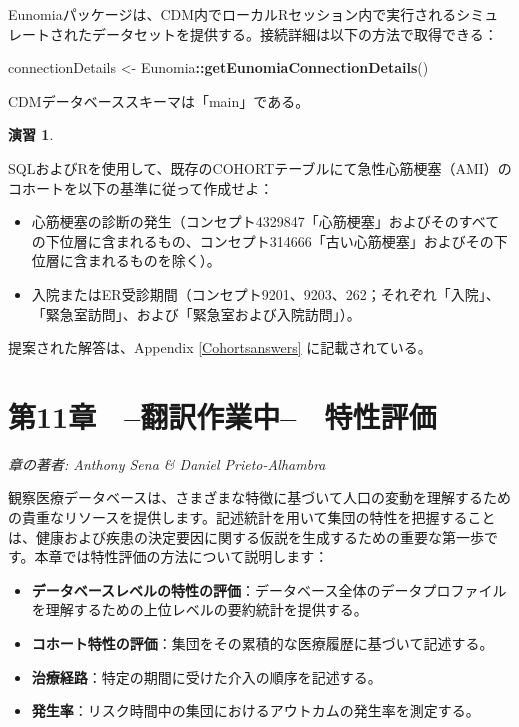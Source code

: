 \documentclass[
  11pt]{book}
\newenvironment{Shaded}{\begin{snugshade}}{\end{snugshade}}
\newcommand{\FunctionTok}[1]{\textcolor[rgb]{0.13,0.29,0.53}{\textbf{#1}}}
\newcommand{\NormalTok}[1]{#1}
\newcommand{\OtherTok}[1]{\textcolor[rgb]{0.56,0.35,0.01}{#1}}
\newcommand{\SpecialCharTok}[1]{\textcolor[rgb]{0.81,0.36,0.00}{\textbf{#1}}}
\providecommand{\tightlist}{%
  \setlength{\itemsep}{0pt}\setlength{\parskip}{0pt}}
\theoremstyle{definition}
\theoremstyle{definition}
\theoremstyle{definition}
\newtheorem{exercise}{演習}[chapter]
\theoremstyle{definition}
\theoremstyle{remark}
\begin{document}
Eunomiaパッケージは、CDM内でローカルRセッション内で実行されるシミュレートされたデータセットを提供する。接続詳細は以下の方法で取得できる：

\begin{Shaded}
\begin{Highlighting}[]
\NormalTok{connectionDetails }\OtherTok{\textless{}{-}}\NormalTok{ Eunomia}\SpecialCharTok{::}\FunctionTok{getEunomiaConnectionDetails}\NormalTok{()}
\end{Highlighting}
\end{Shaded}

CDMデータベーススキーマは「main」である。

\begin{exercise}
\protect\hypertarget{exr:exerciseCohortsSql}{}\label{exr:exerciseCohortsSql}

SQLおよびRを使用して、既存のCOHORTテーブルにて急性心筋梗塞（AMI）のコホートを以下の基準に従って作成せよ：

\begin{itemize}
\tightlist
\item
  心筋梗塞の診断の発生（コンセプト4329847「心筋梗塞」およびそのすべての下位層に含まれるもの、コンセプト314666「古い心筋梗塞」およびその下位層に含まれるものを除く）。
\item
  入院またはER受診期間（コンセプト9201、9203、262；それぞれ「入院」、 「緊急室訪問」、および「緊急室および入院訪問」）。
\end{itemize}

\end{exercise}

提案された解答は、Appendix \ref{Cohortsanswers} に記載されている。

\chapter{第11章　--翻訳作業中--　特性評価}\label{Characterization}

\emph{章の著者: Anthony Sena \& Daniel Prieto-Alhambra}

観察医療データベースは、さまざまな特徴に基づいて人口の変動を理解するための貴重なリソースを提供します。記述統計を用いて集団の特性を把握することは、健康および疾患の決定要因に関する仮説を生成するための重要な第一歩です。本章では特性評価の方法について説明します：

\begin{itemize}
\tightlist
\item
  \textbf{データベースレベルの特性の評価}：データベース全体のデータプロファイルを理解するための上位レベルの要約統計を提供する。
\item
  \textbf{コホート特性の評価}：集団をその累積的な医療履歴に基づいて記述する。
\item
  \textbf{治療経路}：特定の期間に受けた介入の順序を記述する。
\item
  \textbf{発生率}：リスク時間中の集団におけるアウトカムの発生率を測定する。
\end{itemize}
\end{document}
